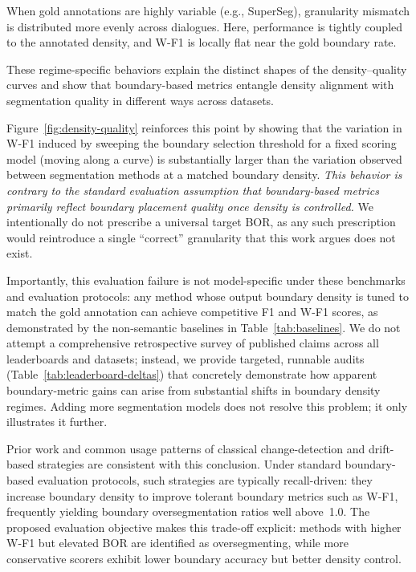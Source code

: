 \documentclass{article}
\begin{document}
When gold annotations are highly variable (e.g., SuperSeg),
granularity mismatch is distributed more evenly across dialogues.
Here, performance is tightly coupled to the annotated density, and
W-F1 is locally flat near the gold boundary rate.

These regime-specific behaviors explain the distinct shapes of the
density--quality curves and show that boundary-based metrics entangle
density alignment with segmentation quality in different ways across
datasets.

Figure~\ref{fig:density-quality} reinforces this point by showing that
the variation in W-F1 induced by sweeping the boundary selection
threshold for a fixed scoring model (moving along a curve) is
substantially larger than the variation observed between segmentation
methods at a matched boundary density.
\emph{This behavior is contrary to the standard evaluation assumption
that boundary-based metrics primarily reflect boundary placement
quality once density is controlled.}
We intentionally do not prescribe a universal target BOR, as any such
prescription would reintroduce a single ``correct'' granularity that
this work argues does not exist.

Importantly, this evaluation failure is not model-specific under these
benchmarks and evaluation protocols: any method whose output boundary
density is tuned to match the gold annotation can achieve competitive
F1 and W-F1 scores, as demonstrated by the non-semantic baselines in
Table~\ref{tab:baselines}. We do not attempt a comprehensive
retrospective survey of published claims across all leaderboards and
datasets; instead, we provide targeted, runnable audits
(Table~\ref{tab:leaderboard-deltas}) that concretely demonstrate how
apparent boundary-metric gains can arise from substantial shifts in
boundary density regimes. Adding more segmentation models does not
resolve this problem; it only illustrates it further.

Prior work and common usage patterns of classical change-detection and
drift-based strategies are consistent with this conclusion. Under
standard boundary-based evaluation protocols, such strategies are
typically recall-driven: they increase boundary density to improve
tolerant boundary metrics such as W-F1, frequently yielding boundary
oversegmentation ratios well above~1.0. The proposed evaluation
objective makes this trade-off explicit: methods with higher W-F1 but
elevated BOR are identified as oversegmenting, while more conservative
scorers exhibit lower boundary accuracy but better density control.
\end{document}
